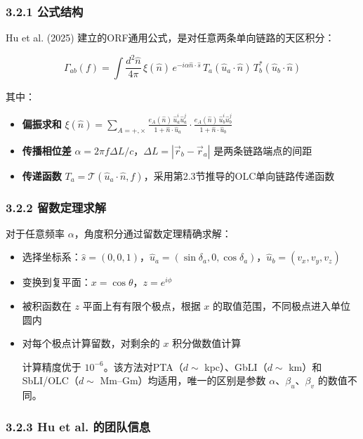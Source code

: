 \documentclass[12pt,a4paper]{article}
\begin{document}
\subsubsection{3.2.1 公式结构}


Hu et al. (2025) 建立的ORF通用公式，是对任意两条单向链路的天区积分\cite{ref9}：

$$\Gamma_{ab}(f) = \int \frac{d^2\hat{n}}{4\pi}\, \xi(\hat{n})\, e^{-i\alpha \hat{n}\cdot\hat{s}}\, T_a(\hat{u}_a\cdot\hat{n})\, T_b^*(\hat{u}_b\cdot\hat{n})$$

其中：

\begin{itemize}
  \item \textbf{偏振求和} $\xi(\hat{n}) = \sum_{A=+,\times} \frac{e_A(\hat{n})\, \hat{u}_a^i \hat{u}_a^j}{1+\hat{n}\cdot\hat{u}_a} \cdot \frac{e_A(\hat{n})\, \hat{u}_b^i \hat{u}_b^j}{1+\hat{n}\cdot\hat{u}_b}$

  \item \textbf{传播相位差} $\alpha = 2\pi f \Delta L / c$，$\Delta L = |\vec{r}_b - \vec{r}_a|$ 是两条链路端点的间距

  \item \textbf{传递函数} $T_a = \mathcal{T}(\hat{u}_a\cdot\hat{n}, f)$，采用第2.3节推导的OLC单向链路传递函数

\end{itemize}
\subsubsection{3.2.2 留数定理求解}


对于任意频率 $\alpha$，角度积分通过留数定理精确求解：

\begin{itemize}
  \item[1] 选择坐标系：$\hat{s} = (0,0,1)$，$\hat{u}_a = (\sin\delta_a, 0, \cos\delta_a)$，$\hat{u}_b = (v_x, v_y, v_z)$
  \item[2] 变换到复平面：$x = \cos\theta$，$z = e^{i\phi}$
  \item[3] 被积函数在 $z$ 平面上有有限个极点，根据 $x$ 的取值范围，不同极点进入单位圆内
  \item[4] 对每个极点计算留数，对剩余的 $x$ 积分做数值计算

计算精度优于 $10^{-6}$。该方法对PTA（$d \sim$ kpc）、GbLI（$d \sim$ km）和SbLI/OLC（$d \sim$ Mm–Gm）均适用，唯一的区别是参数 $\alpha$、$\beta_u$、$\beta_v$ 的数值不同。

\end{itemize}
\subsubsection{3.2.3 Hu et al. 的团队信息}
\end{document}
